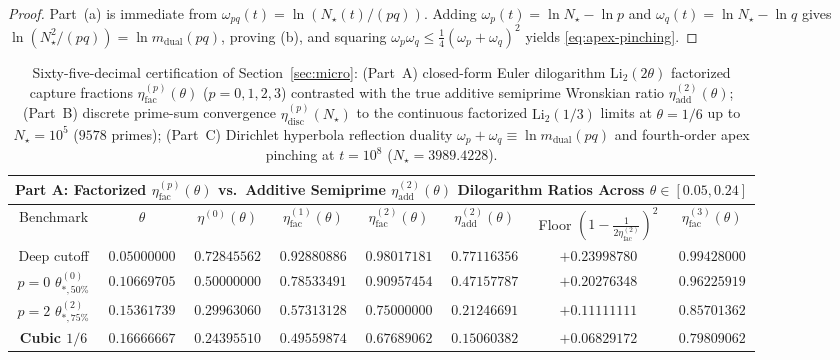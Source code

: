 \documentclass[11pt,reqno]{amsart}
\theoremstyle{definition}
\theoremstyle{remark}
\numberwithin{equation}{section}
\newcommand{\Li}{\mathrm{Li}}
\newcommand{\dual}{\mathrm{dual}}
\newcommand{\facw}{\mathrm{fac}}
\newcommand{\addw}{\mathrm{add}}
\begin{document}
\begin{proof}
Part~(a) is immediate from $\omega_{pq}(t) = \ln(N_\star(t)/(pq))$. Adding $\omega_p(t) = \ln N_\star - \ln p$ and $\omega_q(t) = \ln N_\star - \ln q$ gives $\ln(N_\star^2/(pq)) = \ln m_{\dual}(pq)$, proving (b), and squaring $\omega_p\omega_q \le \frac{1}{4}(\omega_p+\omega_q)^2$ yields \eqref{eq:apex-pinching}.
\end{proof}

\begin{table}[htbp]
\centering
\caption{Sixty-five-decimal certification of Section~\ref{sec:micro}: (Part~A) closed-form Euler dilogarithm $\Li_2(2\theta)$ factorized capture fractions $\eta_{\facw}^{(p)}(\theta)$ ($p=0,1,2,3$) contrasted with the true additive semiprime Wronskian ratio $\eta_{\addw}^{(2)}(\theta)$; (Part~B) discrete prime-sum convergence $\eta_{\mathrm{disc}}^{(p)}(N_\star)$ to the continuous factorized $\Li_2(1/3)$ limits at $\theta=1/6$ up to $N_\star = 10^5$ ($9578$ primes); (Part~C) Dirichlet hyperbola reflection duality $\omega_p+\omega_q \equiv \ln m_{\dual}(pq)$ and fourth-order apex pinching at $t = 10^8$ ($N_\star = 3989.4228$).}
\label{tab:micro-certification}
\tiny
\setlength{\tabcolsep}{1.0pt}
\renewcommand{\arraystretch}{1.14}
\begin{tabular}{@{}cccccccc@{}}
\toprule
\multicolumn{8}{c}{\textbf{Part A: Factorized $\eta_{\facw}^{(p)}(\theta)$ vs.\ Additive Semiprime $\eta_{\addw}^{(2)}(\theta)$ Dilogarithm Ratios Across $\theta \in [0.05, 0.24]$}} \\
\midrule
Benchmark & $\theta$ & $\eta^{(0)}(\theta)$ & $\eta_{\facw}^{(1)}(\theta)$ & $\eta_{\facw}^{(2)}(\theta)$ & $\eta_{\addw}^{(2)}(\theta)$ & Floor $(1-\frac{1}{2\eta_{\facw}^{(2)}})^2$ & $\eta_{\facw}^{(3)}(\theta)$ \\
\midrule
Deep cutoff & $0.05000000$ & $0.72845562$ & $0.92880886$ & $0.98017181$ & $0.77116356$ & $+0.23998780$ & $0.99428000$ \\
$p=0$ $\theta_{*,50\%}^{(0)}$ & $0.10669705$ & $\mathbf{0.50000000}$ & $0.78533491$ & $0.90957454$ & $0.47157787$ & $+0.20276348$ & $0.96225919$ \\
$p=2$ $\theta_{*,75\%}^{(2)}$ & $0.15361739$ & $0.29963060$ & $0.57313128$ & $\mathbf{0.75000000}$ & $0.21246691$ & $+0.11111111$ & $0.85701362$ \\
\textbf{Cubic $1/6$} & $\mathbf{0.16666667}$ & $\mathbf{0.24395510}$ & $\mathbf{0.49559874}$ & $\mathbf{0.67689062}$ & $\mathbf{0.15060382}$ & $\mathbf{+0.06829172}$ & $\mathbf{0.79809062}$ \\

\end{tabular}
\end{table}
\end{document}
